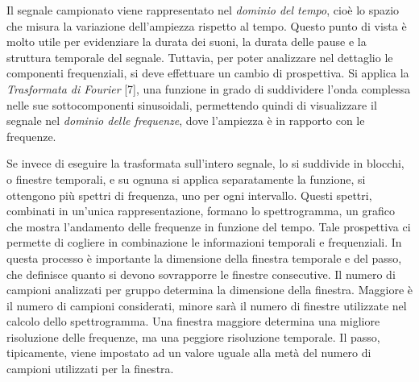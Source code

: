 Il segnale campionato viene rappresentato nel \textit{dominio del tempo}, cioè lo spazio che misura la
variazione dell’ampiezza rispetto al tempo. Questo punto di vista è molto utile per
evidenziare la durata dei suoni, la durata delle pause e la struttura temporale del segnale.
Tuttavia, per poter analizzare nel dettaglio le componenti frequenziali, si deve effettuare un
cambio di prospettiva. Si applica la \textit{Trasformata di Fourier} [7], una funzione in grado di
suddividere l’onda complessa nelle sue sottocomponenti sinusoidali, permettendo quindi di
visualizzare il segnale nel \textit{dominio delle frequenze}, dove l’ampiezza è in rapporto con le
frequenze.

Se invece di eseguire la trasformata sull’intero segnale, lo si suddivide in blocchi, o finestre
temporali, e su ognuna si applica separatamente la funzione, si ottengono più spettri di
frequenza, uno per ogni intervallo. Questi spettri, combinati in un'unica rappresentazione,
formano lo spettrogramma, un grafico che mostra l’andamento delle frequenze in funzione
del tempo. Tale prospettiva ci permette di cogliere in combinazione le informazioni temporali
e frequenziali. In questa processo è importante la dimensione della finestra temporale e del
passo, che definisce quanto si devono sovrapporre le finestre consecutive. Il numero di
campioni analizzati per gruppo determina la dimensione della finestra. Maggiore è il numero
di campioni considerati, minore sarà il numero di finestre utilizzate nel calcolo dello
spettrogramma. Una finestra maggiore determina una migliore risoluzione delle frequenze,
ma una peggiore risoluzione temporale. Il passo, tipicamente, viene impostato ad un valore
uguale alla metà del numero di campioni utilizzati per la finestra.

